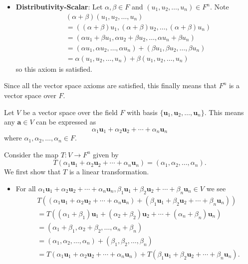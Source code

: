 \begin{questions}
\begin{itemize}
        \item \textbf{Distributivity-Scalar}: Let $\alpha, \beta \in F$ and $(u_1, u_2, \dots, u_n) \in F^n$. Note
        \begin{align*}
            &(\alpha+\beta)(u_1, u_2, \dots, u_n)\\
            &= ((\alpha+\beta)u_1, (\alpha+\beta)u_2, \dots, (\alpha+\beta)u_n)\\
            &= (\alpha u_1 + \beta u_1, \alpha u_2 + \beta u_2, \dots, \alpha u_n + \beta u_n)\\
            &= (\alpha u_1, \alpha u_2, \dots, \alpha u_n) + (\beta u_1, \beta u_2, \dots, \beta u_n)\\
            &= \alpha(u_1, u_2, \dots, u_n) + \beta(u_1, u_2, \dots, u_n)
        \end{align*}
        so this axiom is satisfied.
    \end{itemize}
    Since all the vector space axioms are satisfied, this finally means that $F^n$ is a vector space over $F$.

    \item Let $V$ be a vector space over the field $F$ with basis $\{\mathbf{u}_1, \mathbf{u}_2, \dots, \mathbf{u}_n\}$. This means any $\mathbf{a} \in V$ can be expressed as
    \[
        \alpha_1\mathbf{u}_1 + \alpha_2\mathbf{u}_2 + \cdots + \alpha_n\mathbf{u}_n
    \]
    where $\alpha_1,\alpha_2,\dots,\alpha_n \in F$.

    Consider the map $T: V \to F^n$ given by
    \[
        T( \alpha_1\mathbf{u}_1 + \alpha_2\mathbf{u}_2 + \cdots + \alpha_n\mathbf{u}_n) = (\alpha_1, \alpha_2, \dots, \alpha_n).
    \]
    We first show that $T$ is a linear transformation.
    \begin{itemize}
        \item For all $\alpha_1\mathbf{u}_1 + \alpha_2\mathbf{u}_2 + \cdots + \alpha_n\mathbf{u}_n, \beta_1\mathbf{u}_1 + \beta_2\mathbf{u}_2 + \cdots + \beta_n\mathbf{u}_n \in V$ we see
        {
            \fontsize{9.5pt}{11pt}\selectfont
            \begin{align*}
                &T((\alpha_1\mathbf{u}_1 + \alpha_2\mathbf{u}_2 + \cdots + \alpha_n\mathbf{u}_n) + (\beta_1\mathbf{u}_1 + \beta_2\mathbf{u}_2 + \cdots + \beta_n\mathbf{u}_n))\\
                &= T((\alpha_1 + \beta_1)\mathbf{u}_1 + (\alpha_2 + \beta_2)\mathbf{u}_2 + \cdots + (\alpha_n + \beta_n)\mathbf{u}_n)\\
                &= (\alpha_1 + \beta_1, \alpha_2 + \beta_2, \dots, \alpha_n + \beta_n)\\
                &= (\alpha_1, \alpha_2, \dots, \alpha_n) + (\beta_1, \beta_2, \dots, \beta_n)\\
                &= T(\alpha_1\mathbf{u}_1 + \alpha_2\mathbf{u}_2 + \cdots + \alpha_n\mathbf{u}_n) + T(\beta_1\mathbf{u}_1 + \beta_2\mathbf{u}_2 + \cdots + \beta_n\mathbf{u}_n).
            \end{align*}
        }


\end{itemize}
\end{questions}
